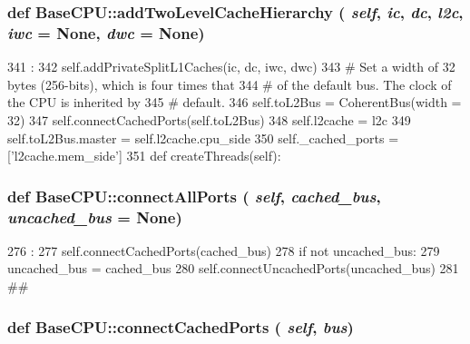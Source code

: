 \hypertarget{namespaceBaseCPU_a41ff86a3a8e8eda4aa0a61a14518c09a}{
\subsubsection[{addTwoLevelCacheHierarchy}]{\setlength{\rightskip}{0pt plus 5cm}def BaseCPU::addTwoLevelCacheHierarchy ( {\em self}, \/   {\em ic}, \/   {\em dc}, \/   {\em l2c}, \/   {\em iwc} = {\ttfamily None}, \/   {\em dwc} = {\ttfamily None})}}
\label{namespaceBaseCPU_a41ff86a3a8e8eda4aa0a61a14518c09a}



\begin{DoxyCode}
341                                                                             :
342         self.addPrivateSplitL1Caches(ic, dc, iwc, dwc)
343         # Set a width of 32 bytes (256-bits), which is four times that
344         # of the default bus. The clock of the CPU is inherited by
345         # default.
346         self.toL2Bus = CoherentBus(width = 32)
347         self.connectCachedPorts(self.toL2Bus)
348         self.l2cache = l2c
349         self.toL2Bus.master = self.l2cache.cpu_side
350         self._cached_ports = ['l2cache.mem_side']
351 
    def createThreads(self):
\end{DoxyCode}
\hypertarget{namespaceBaseCPU_a2fdb04d818d2d05d543deeb45cacfe20}{
\subsubsection[{connectAllPorts}]{\setlength{\rightskip}{0pt plus 5cm}def BaseCPU::connectAllPorts ( {\em self}, \/   {\em cached\_\-bus}, \/   {\em uncached\_\-bus} = {\ttfamily None})}}
\label{namespaceBaseCPU_a2fdb04d818d2d05d543deeb45cacfe20}



\begin{DoxyCode}
276                                                               :
277         self.connectCachedPorts(cached_bus)
278         if not uncached_bus:
279             uncached_bus = cached_bus
280         self.connectUncachedPorts(uncached_bus)
281 
##
\end{DoxyCode}
\hypertarget{namespaceBaseCPU_a372b5c90dd183c956b0e8a6f1c0919d9}{
\subsubsection[{connectCachedPorts}]{\setlength{\rightskip}{0pt plus 5cm}def BaseCPU::connectCachedPorts ( {\em self}, \/   {\em bus})}}
\label{namespaceBaseCPU_a372b5c90dd183c956b0e8a6f1c0919d9}



